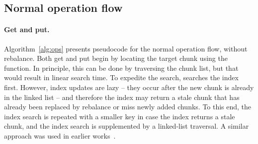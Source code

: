 \subsection{Normal operation flow}
\label{ssec:ops}

\paragraph{Get and put.}

Algorithm~\ref{alg:ops}  presents pseudocode for the normal operation flow, without rebalance.
Both get and put begin by locating the target chunk using the  function. In principle, this can be done by traversing the chunk list, but that would result in linear search time. To expedite the search,    searches the index first. However, index updates are lazy -- they occur after the new chunk is already
in the linked list -- and therefore the index may return a stale chunk that has already been replaced by rebalance or miss newly added chunks. To this end, the index search is repeated with a smaller key in case the index returns a stale chunk, and the index search is supplemented by a linked-list traversal. A similar approach was used in earlier works~\cite{kiwi,tdls}. 




